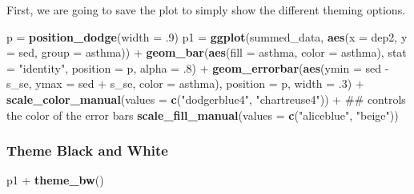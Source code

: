 \documentclass[]{tufte-book}
\newenvironment{Shaded}{}{}
\newcommand{\KeywordTok}[1]{\textcolor[rgb]{0.00,0.44,0.13}{\textbf{#1}}}
\newcommand{\DataTypeTok}[1]{\textcolor[rgb]{0.56,0.13,0.00}{#1}}
\newcommand{\DecValTok}[1]{\textcolor[rgb]{0.25,0.63,0.44}{#1}}
\newcommand{\StringTok}[1]{\textcolor[rgb]{0.25,0.44,0.63}{#1}}
\newcommand{\OperatorTok}[1]{\textcolor[rgb]{0.40,0.40,0.40}{#1}}
\newcommand{\NormalTok}[1]{#1}
\theoremstyle{definition}
\theoremstyle{definition}
\theoremstyle{remark}
\begin{document}
First, we are going to save the plot to simply show the different
theming options.

\begin{Shaded}
\begin{Highlighting}[]
\NormalTok{p =}\StringTok{ }\KeywordTok{position_dodge}\NormalTok{(}\DataTypeTok{width =}\NormalTok{ .}\DecValTok{9}\NormalTok{)}
\NormalTok{p1 =}\StringTok{ }\KeywordTok{ggplot}\NormalTok{(summed_data, }\KeywordTok{aes}\NormalTok{(}\DataTypeTok{x =}\NormalTok{ dep2, }\DataTypeTok{y =}\NormalTok{ sed, }\DataTypeTok{group =}\NormalTok{ asthma)) }\OperatorTok{+}
\StringTok{  }\KeywordTok{geom_bar}\NormalTok{(}\KeywordTok{aes}\NormalTok{(}\DataTypeTok{fill =}\NormalTok{ asthma, }\DataTypeTok{color =}\NormalTok{ asthma), }
           \DataTypeTok{stat =} \StringTok{"identity"}\NormalTok{, }
           \DataTypeTok{position =}\NormalTok{ p,}
           \DataTypeTok{alpha =}\NormalTok{ .}\DecValTok{8}\NormalTok{) }\OperatorTok{+}
\StringTok{  }\KeywordTok{geom_errorbar}\NormalTok{(}\KeywordTok{aes}\NormalTok{(}\DataTypeTok{ymin =}\NormalTok{ sed }\OperatorTok{-}\StringTok{ }\NormalTok{s_se, }\DataTypeTok{ymax =}\NormalTok{ sed }\OperatorTok{+}\StringTok{ }\NormalTok{s_se,}
                    \DataTypeTok{color =}\NormalTok{ asthma), }
                \DataTypeTok{position =}\NormalTok{ p,}
                \DataTypeTok{width =}\NormalTok{ .}\DecValTok{3}\NormalTok{) }\OperatorTok{+}
\StringTok{  }\KeywordTok{scale_color_manual}\NormalTok{(}\DataTypeTok{values =} \KeywordTok{c}\NormalTok{(}\StringTok{"dodgerblue4"}\NormalTok{, }\StringTok{"chartreuse4"}\NormalTok{)) }\OperatorTok{+}\StringTok{   }\NormalTok{## controls the color of the error bars}
\StringTok{  }\KeywordTok{scale_fill_manual}\NormalTok{(}\DataTypeTok{values =} \KeywordTok{c}\NormalTok{(}\StringTok{"aliceblue"}\NormalTok{, }\StringTok{"beige"}\NormalTok{))}
\end{Highlighting}
\end{Shaded}

\subsubsection*{Theme Black and White}\label{theme-black-and-white}

\begin{Shaded}
\begin{Highlighting}[]
\NormalTok{p1 }\OperatorTok{+}\StringTok{ }\KeywordTok{theme_bw}\NormalTok{()}
\end{Highlighting}
\end{Shaded}
\end{document}
